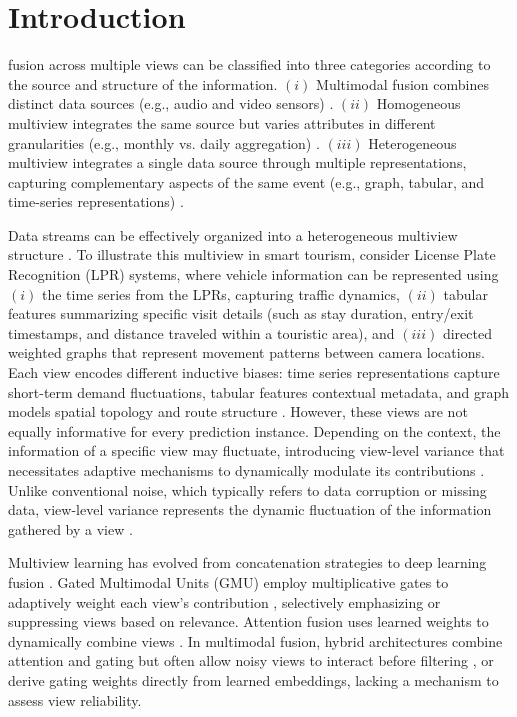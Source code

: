 \documentclass[journal]{IEEEtran}
\begin{document}
\section{Introduction}

 fusion across multiple views can be classified into three categories according to the source and structure of the information. $(i)$ Multimodal fusion combines distinct data sources (e.g., audio and video sensors) \cite{lin2024m3sa,ilias2024cross,wu2024wttfnet, zhou2024large}. $(ii)$ Homogeneous multiview integrates the same source but varies attributes in different granularities (e.g., monthly vs. daily aggregation) \cite{chen2025detection, guo2024contrastive, jiang2023multi}. $(iii)$ Heterogeneous multiview integrates a single data source through multiple representations, capturing complementary aspects of the same event (e.g., graph, tabular, and time-series representations) \cite{cao2023multi, yi2022multi}.

Data streams can be effectively organized into a heterogeneous multiview structure \cite{yu2025review}. To illustrate this multiview in smart tourism, consider License Plate Recognition (LPR) systems, where vehicle information can be represented using $(i)$ the time series from the LPRs, capturing traffic dynamics, $(ii)$ tabular features summarizing specific visit details (such as stay duration, entry/exit timestamps, and distance traveled within a touristic area), and $(iii)$ directed weighted graphs that represent movement patterns between camera locations. Each view encodes different inductive biases: time series representations capture short-term demand fluctuations, tabular features contextual metadata, and graph models spatial topology and route structure \cite{yu2025review}. However, these views are not equally informative for every prediction instance. Depending on the context, the information of a specific view may fluctuate, introducing view-level variance that necessitates adaptive mechanisms to dynamically modulate its contributions \cite{hou2024mvqs}. Unlike conventional noise, which typically refers to data corruption or missing data, view-level variance represents the dynamic fluctuation of the information gathered by a view \cite{malawade2022hydrafusion}.


Multiview learning has evolved from concatenation strategies to deep learning fusion \cite{yu2025review}. Gated Multimodal Units (GMU) employ multiplicative gates to adaptively weight each view's contribution \cite{rohanian2019gated,arevalo2020gated}, selectively emphasizing or suppressing views based on relevance. Attention fusion uses learned weights to dynamically combine views \cite{lin2024m3sa,wei2022subattentional}. In multimodal fusion, hybrid architectures combine attention and gating but often allow noisy views to interact before filtering \cite{ilias2024cross}, or derive gating weights directly from learned embeddings, lacking a mechanism to assess view reliability.
\end{document}
